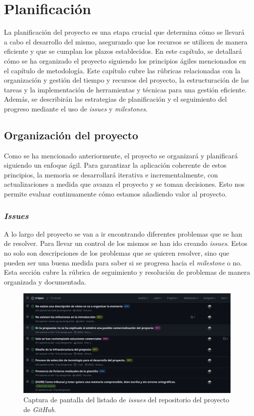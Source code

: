 \chapter{Planificación}

La planificación del proyecto es una etapa crucial que determina cómo se llevará a cabo el desarrollo del mismo, asegurando que los recursos se utilicen de manera eficiente y que se cumplan los plazos establecidos. En este capítulo, se detallará cómo se ha organizado el proyecto siguiendo los principios ágiles mencionados en el capítulo de metodología. Este capítulo cubre las rúbricas relacionadas con la organización y gestión del tiempo y recursos del proyecto, la estructuración de las tareas y la implementación de herramientas y técnicas para una gestión eficiente. Además, se describirán las estrategias de planificación y el seguimiento del progreso mediante el uso de \textit{issues} y \textit{milestones}.

\section{Organización del proyecto}

Como se ha mencionado anteriormente, el proyecto se organizará y planificará siguiendo un enfoque ágil. Para garantizar la aplicación coherente de estos principios, la memoria se desarrollará iterativa e incrementalmente, con actualizaciones a medida que avanza el proyecto y se toman decisiones. Esto nos permite evaluar continuamente cómo estamos añadiendo valor al proyecto.

\subsection{\textit{Issues}}

A lo largo del proyecto se van a ir encontrando diferentes problemas que se han de resolver. Para llevar un control de los mismos se han ido creando \textit{issues}. Estos no solo son descripciones de los problemas que se quieren resolver, sino que pueden ser una buena medida para saber si se progresa hacia el \textit{milestone} o no. Esta sección cubre la rúbrica de seguimiento y resolución de problemas de manera organizada y documentada.

\begin{figure}[H]
    \caption{Captura de pantalla del listado de \textit{issues} del repositorio del proyecto de \textit{GitHub}.}
    \centering
    \vspace*{0.5cm}
    \includegraphics[scale=0.2]{figuras/github_issues.png}
\end{figure}

